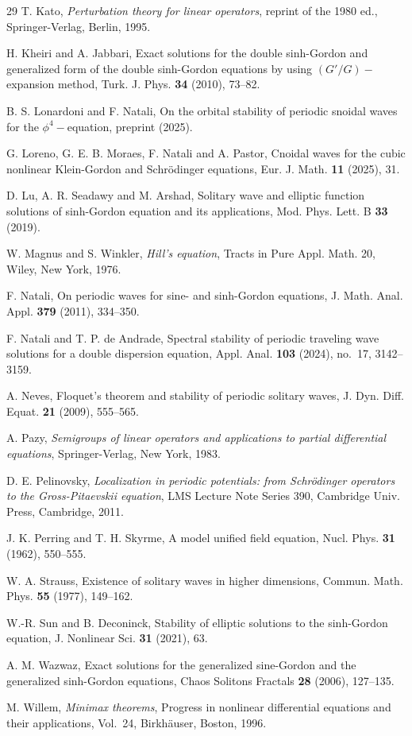 \documentclass[12pt,reqno,a4paper]{amsart} %
\numberwithin{equation}{section}
\numberwithin{figure}{section}
\begin{document}
\begin{thebibliography}{29}
T. Kato,
\textit{Perturbation theory for linear operators},
reprint of the 1980 ed., Springer-Verlag, Berlin, 1995.

H. Kheiri and A. Jabbari,
Exact solutions for the double sinh-Gordon and generalized form of the double sinh-Gordon equations by using $(G'/G)-$expansion method,
Turk. J. Phys. \textbf{34} (2010), 73--82.

B. S. Lonardoni and F. Natali,
On the orbital stability of periodic snoidal waves for the $\phi^4-$equation,
preprint (2025).

G. Loreno, G. E. B. Moraes, F. Natali and A. Pastor,
Cnoidal waves for the cubic nonlinear Klein-Gordon and Schr\" odinger equations,
Eur. J. Math. \textbf{11} (2025), 31.

D. Lu, A. R. Seadawy and M. Arshad,
Solitary wave and elliptic function solutions of sinh-Gordon equation and its applications,
Mod. Phys. Lett. B \textbf{33} (2019). %
 
W. Magnus and S. Winkler,
\textit{Hill's equation},
Tracts in Pure Appl. Math. 20, Wiley, New York, 1976.

F. Natali,
On periodic waves for sine- and sinh-Gordon equations,
J. Math. Anal. Appl. \textbf{379} (2011), 334--350.

F. Natali and T. P. de Andrade,
Spectral stability of periodic traveling wave solutions for a double dispersion equation,
Appl. Anal. \textbf{103} (2024), no.~17, 3142--3159.

A. Neves,
Floquet's theorem and stability of periodic solitary waves,
J. Dyn. Diff. Equat. \textbf{21} (2009), 555--565.

A. Pazy,
\textit{Semigroups of linear operators and applications to partial differential equations},
Springer-Verlag, New York, 1983.

D. E. Pelinovsky,
\textit{Localization in periodic potentials: from Schr\"odinger operators to the Gross-Pitaevskii equation},
LMS Lecture Note Series 390, Cambridge Univ. Press, Cambridge, 2011.

J. K. Perring and T. H. Skyrme,
A model unified field equation,
Nucl. Phys. \textbf{31} (1962), 550--555.

W. A. Strauss,
Existence of solitary waves in higher dimensions,
Commun. Math. Phys. \textbf{55} (1977), 149--162.

W.-R. Sun and B. Deconinck,
Stability of elliptic solutions to the sinh-Gordon equation,
J. Nonlinear Sci. \textbf{31} (2021), 63.

A. M. Wazwaz,
Exact solutions for the generalized sine-Gordon and the generalized sinh-Gordon equations,
Chaos Solitons Fractals \textbf{28} (2006), 127--135.

M. Willem,
\textit{Minimax theorems},
Progress in nonlinear differential equations and their applications, Vol.~24,
Birkh\" auser, Boston, 1996.
\end{thebibliography}
\end{document}
